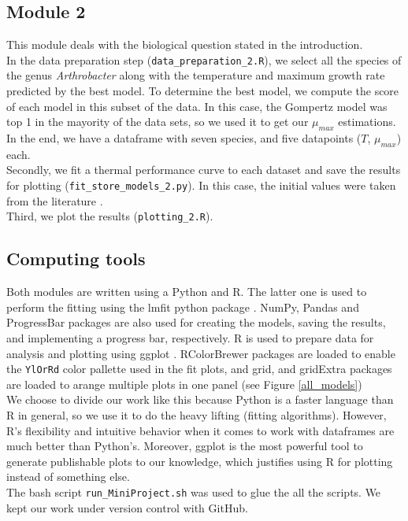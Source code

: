 \documentclass[titlepage,11pt]{article}
\begin{document}
\begin{linenumbers}
	\subsection{Module 2}
	This module deals with the biological question stated in the introduction. \\
	In the data preparation step (\verb|data_preparation_2.R|), we select all the species of the genus \textit{Arthrobacter} along with the temperature and maximum growth rate predicted by the best model. To determine the best model, we compute the score of each model in this subset of the data. In this case, the Gompertz model was top 1 in the mayority of the data sets, so we used it to get our $ \mu_{max} $ estimations. In the end, we have a dataframe with seven species, and five datapoints ($ T $, $ \mu_{max} $) each. \\
	Secondly, we fit a thermal performance curve to each dataset and save the results for plotting (\verb|fit_store_models_2.py|). In this case, the initial values were taken from the literature  \cite{Lactin1995}.\\
	Third, we plot the results (\verb|plotting_2.R|).
	\subsection{Computing tools}
	Both modules are written using a Python and R. The latter one is used to perform the fitting using the lmfit python package \cite{Newville2014}. NumPy, Pandas \cite{Virtanen2020} and ProgressBar packages are also used for creating the models, saving the results, and implementing a progress bar, respectively. R is used to prepare data for analysis and plotting using ggplot \cite{Wickham2016}. RColorBrewer packages are loaded to enable the \verb|YlOrRd| color pallette used in the fit plots, and  grid, and gridExtra packages are loaded to arange multiple plots in one panel (see Figure \ref{all_models})\\
	We choose to divide our work like this because Python is a faster language than R in general, so we use it to do the heavy lifting (fitting algorithms). However, R's flexibility and intuitive behavior when it comes to work with dataframes are much better than Python's. Moreover, ggplot is the most powerful tool to generate publishable plots to our knowledge, which justifies using R for plotting instead of something else.\\
	The bash script \verb|run_MiniProject.sh| was used to glue the all the scripts. We kept our work under version control with GitHub.
	

\end{linenumbers}
\end{document}
